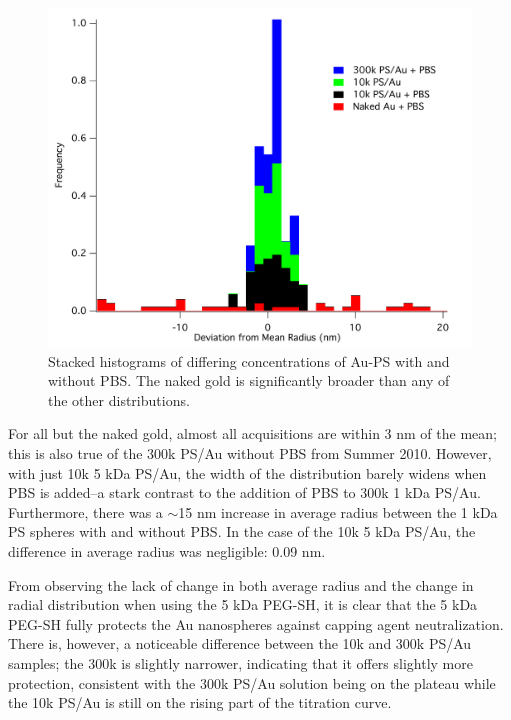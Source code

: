 \begin{figure}[htbp]
\centering
\includegraphics[keepaspectratio,width=5in,height=0.75\textheight]{RadiusHistPBS.pdf}
\caption{Stacked histograms of differing concentrations of Au-PS with and without PBS. The naked gold is significantly broader than any of the other distributions.}
\label{protection}
\end{figure}



For all but the naked gold, almost all acquisitions are within 3 nm of the mean; this is also true of the 300k PS\slash Au without PBS from Summer 2010. However, with just 10k 5 kDa PS\slash Au, the width of the distribution barely widens when PBS is added--a stark contrast to the addition of PBS to 300k 1 kDa PS\slash Au. Furthermore, there was a \ensuremath{\sim}15 nm increase in average radius between the 1 kDa PS spheres with and without PBS. In the case of the 10k 5 kDa PS\slash Au, the difference in average radius was negligible: 0.09 nm.

From observing the lack of change in both average radius and the change in radial distribution when using the 5 kDa PEG-SH, it is clear that the 5 kDa PEG-SH fully protects the Au nanospheres against capping agent neutralization. There is, however, a noticeable difference between the 10k and 300k PS\slash Au samples; the 300k is slightly narrower, indicating that it offers slightly more protection, consistent with the 300k PS\slash Au solution being on the plateau while the 10k PS\slash Au is still on the rising part of the titration curve.
